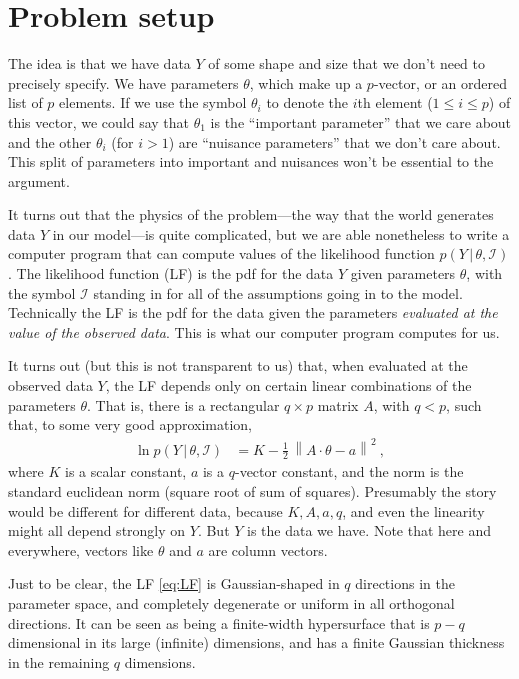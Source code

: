 \documentclass[10pt]{article}
\newcommand{\given}{\,|\,}
\newcommand{\norm}[1]{\left\lVert{#1}\right\rVert}
\begin{document}
\section{Problem setup}
The idea is that we have data $Y$ of some shape and size that we don't need to precisely specify.
We have parameters $\theta$, which make up a $p$-vector, or an ordered list of $p$ elements.
If we use the symbol $\theta_i$ to denote the $i$th element ($1\leq i\leq p$) of this vector, we could say that $\theta_1$ is the ``important parameter'' that we care about and the other $\theta_i$ (for $i>1$) are ``nuisance parameters'' that we don't care about.
This split of parameters into important and nuisances won't be essential to the argument.

It turns out that the physics of the problem---the way that the world generates data $Y$ in our model---is quite complicated, but we are able nonetheless to write a computer program that can compute values of the likelihood function $p(Y\given \theta,\mathscr{I})$.
The likelihood function (LF) is the pdf for the data $Y$ given parameters $\theta$, with the symbol $\mathscr{I}$ standing in for all of the assumptions going in to the model.
Technically the LF is the pdf for the data given the parameters \emph{evaluated at the value of the observed data}.
This is what our computer program computes for us.

It turns out (but this is not transparent to us) that, when evaluated at the observed data $Y$, the LF depends only on certain linear combinations of the parameters $\theta$.
That is, there is a rectangular $q\times p$ matrix $A$, with $q<p$, such that, to some very good approximation,
\begin{align}
    \ln p(Y\given\theta,\mathscr{I}) &= K - \frac{1}{2}\,\norm{A\cdot\theta - a}^2 ~,\label{eq:LF}
\end{align}
where $K$ is a scalar constant, $a$ is a $q$-vector constant, and the norm is the standard euclidean norm (square root of sum of squares).
Presumably the story would be different for different data, because $K, A, a, q$, and even the linearity might all depend strongly on $Y$.
But $Y$ is the data we have.
Note that here and everywhere, vectors like $\theta$ and $a$ are column vectors.

Just to be clear, the LF \eqref{eq:LF} is Gaussian-shaped in $q$ directions in the parameter space, and completely degenerate or uniform in all orthogonal directions.
It can be seen as being a finite-width hypersurface that is $p-q$ dimensional in its large (infinite) dimensions, and has a finite Gaussian thickness in the remaining $q$ dimensions.
\end{document}
